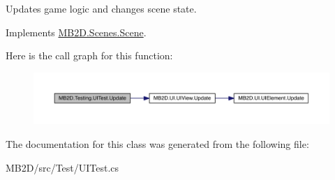 Updates game logic and changes scene state. 



Implements \hyperlink{class_m_b2_d_1_1_scenes_1_1_scene_a779de7c1ab23b698dcde3a228324a991}{M\+B2\+D.\+Scenes.\+Scene}.

Here is the call graph for this function\+:
\nopagebreak
\begin{figure}[H]
\begin{center}
\leavevmode
\includegraphics[width=350pt]{class_m_b2_d_1_1_testing_1_1_u_i_test_a547d5592fee47d4c9354ee8f307c8813_cgraph}
\end{center}
\end{figure}


The documentation for this class was generated from the following file\+:\begin{DoxyCompactItemize}
\item 
M\+B2\+D/src/\+Test/U\+I\+Test.\+cs\end{DoxyCompactItemize}
